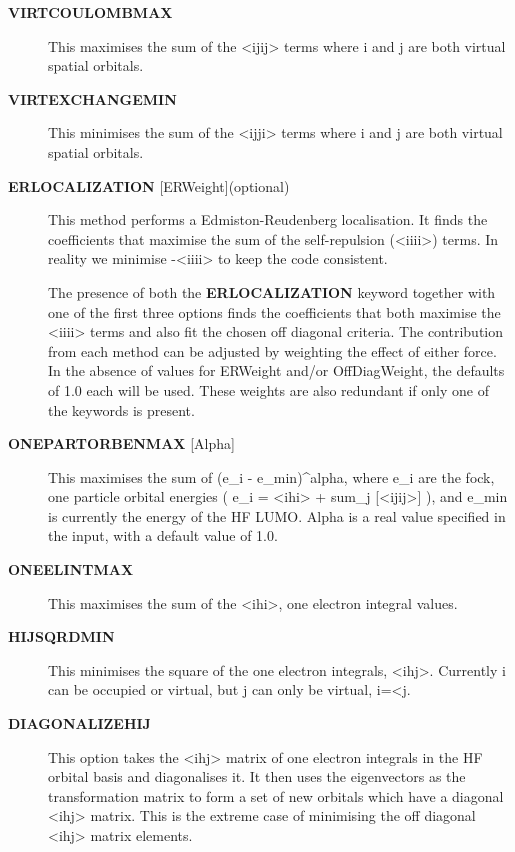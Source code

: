\documentclass[openany,a4paper,10pt,english]{manual}
\begin{document}
\begin{description}
\item[\textbf{VIRTCOULOMBMAX}] \leavevmode
This maximises the sum of the \textless{}ij\textbar{}ij\textgreater{} terms where i and j are both virtual spatial orbitals.

\item[\textbf{VIRTEXCHANGEMIN}] \leavevmode
This minimises the sum of the \textless{}ij\textbar{}ji\textgreater{} terms where i and j are both virtual spatial orbitals.

\item[\textbf{ERLOCALIZATION} {[}ERWeight{]}(optional)] \leavevmode
This method performs a Edmiston-Reudenberg localisation.  It finds the coefficients
that maximise the sum of the self-repulsion (\textless{}ii\textbar{}ii\textgreater{}) terms.
In reality we minimise -\textless{}ii\textbar{}ii\textgreater{} to keep the code consistent.

The presence of both the \textbf{ERLOCALIZATION} keyword together with one of the first three
options finds the coefficients that both maximise the \textless{}ii\textbar{}ii\textgreater{} terms and also fit the chosen
off diagonal criteria.
The contribution from each method can be adjusted by weighting the effect of either force.
In the absence of values for ERWeight and/or OffDiagWeight, the defaults of 1.0 each
will be used.
These weights are also redundant if only one of the keywords is present.

\item[\textbf{ONEPARTORBENMAX} {[}Alpha{]}] \leavevmode
This maximises the sum of (e\_i - e\_min)\textasciicircum{}alpha, where e\_i are the fock, one particle orbital
energies ( e\_i = \textless{}i\textbar{}h\textbar{}i\textgreater{} + sum\_j {[}\textless{}ij\textbar{}\textbar{}ij\textgreater{}{]} ), and e\_min is currently the energy of the
HF LUMO.
Alpha is a real value specified in the input, with a default value of 1.0.

\item[\textbf{ONEELINTMAX}] \leavevmode
This maximises the sum of the \textless{}i\textbar{}h\textbar{}i\textgreater{}, one electron integral values.

\item[\textbf{HIJSQRDMIN}] \leavevmode
This minimises the square of the one electron integrals, \textless{}i\textbar{}h\textbar{}j\textgreater{}.  Currently i can be occupied
or virtual, but j can only be virtual, i=\textless{}j.

\item[\textbf{DIAGONALIZEHIJ}] \leavevmode
This option takes the \textless{}i\textbar{}h\textbar{}j\textgreater{} matrix of one electron integrals in the HF orbital basis and
diagonalises it.  It then uses the eigenvectors as the transformation matrix to form a set
of new orbitals which have a diagonal \textless{}i\textbar{}h\textbar{}j\textgreater{} matrix.  This is the extreme case of minimising
the off diagonal \textless{}i\textbar{}h\textbar{}j\textgreater{} matrix elements.


\end{description}
\end{document}
